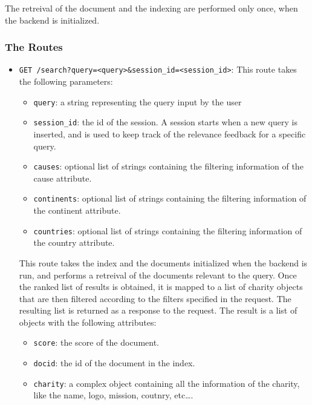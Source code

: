\documentclass[unicode,9pt,a4paper,oneside,numbers=endperiod,openany]{scrartcl}
\begin{document}
The retreival of the document and the indexing are performed only once, when the backend is initialized.

\subsubsection{The Routes}

\begin{itemize}
    \item \texttt{GET /search?query=<query>\&session\_id=<session\_id>}: \newline
          This route takes the following parameters:
          \begin{itemize}
              \item \texttt{query}: a string representing the query input by the user
              \item \texttt{session\_id}: the id of the session. A session starts when a new query is inserted, and is used to keep track of the relevance feedback for a specific query.
              \item \texttt{causes}: optional list of strings containing the filtering information of the cause attribute.
              \item \texttt{continents}: optional list of strings containing the filtering information of the continent attribute.
              \item \texttt{countries}: optional list of strings containing the filtering information of the country attribute.
          \end{itemize}
          This route takes the index and the documents initialized when the backend is run, and performs a retreival of the documents relevant to the query. Once the ranked list of results is obtained, it is mapped to a list of charity objects that are then filtered according to the filters specified in the request. The resulting list is returned as a response to the request.
          The result is a list of objects with the following attributes:
          \begin{itemize}
              \item \texttt{score}: the score of the document.
              \item \texttt{docid}: the id of the document in the index.
              \item \texttt{charity}: a complex object containing all the information of the charity, like the name, logo, mission, coutnry, etc\dots .
          \end{itemize}

\end{itemize}
\end{document}
